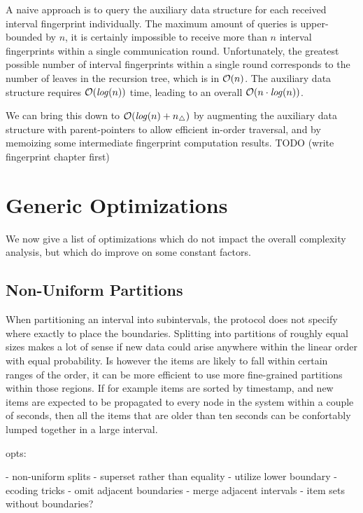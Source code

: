 A naive approach is to query the auxiliary data structure for each received interval fingerprint individually. The maximum amount of queries is upper-bounded by $n$, it is certainly impossible to receive more than $n$ interval fingerprints within a single communication round. Unfortunately, the greatest possible number of interval fingerprints within a single round corresponds to the number of leaves in the recursion tree, which is in $\mathcal{O}(n)$. The auxiliary data structure requires $\mathcal{O}(\mathit{log}(n))$ time, leading to an overall $\mathcal{O}(n \cdot \mathit{log}(n))$.

We can bring this down to $\mathcal{O}(\mathit{log}(n) + n_{\triangle})$ by augmenting the auxiliary data structure with parent-pointers to allow efficient in-order traversal, and by memoizing some intermediate fingerprint computation results. TODO (write fingerprint chapter first)

\section{Generic Optimizations}
\label{set-reconciliation-simple-optimizations}

We now give a list of optimizations which do not impact the overall complexity analysis, but which do improve on some constant factors.

\subsection{Non-Uniform Partitions}

When partitioning an interval into subintervals, the protocol does not specify where exactly to place the boundaries. Splitting into partitions of roughly equal sizes makes a lot of sense if new data could arise anywhere within the linear order with equal probability. Is however the items are likely to fall within certain ranges of the order, it can be more efficient to use more fine-grained partitions within those regions. If for example items are sorted by timestamp, and new items are expected to be propagated to every node in the system within a couple of seconds, then all the items that are older than ten seconds can be confortably lumped together in a large interval.

opts:

- non-uniform splits
- superset rather than equality
- utilize lower boundary
- ecoding tricks
  - omit adjacent boundaries
  - merge adjacent intervals
  -  item sets without boundaries?

